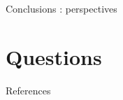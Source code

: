 \documentclass[newPxFont,pagenumber]{beamer}
\begin{document}
\begin{frame}[c]{Conclusions : perspectives}
	
\end{frame}

\section{Questions}




\begin{frame}[t,allowframebreaks]{References}
\tiny

	
\end{frame}
\end{document}
